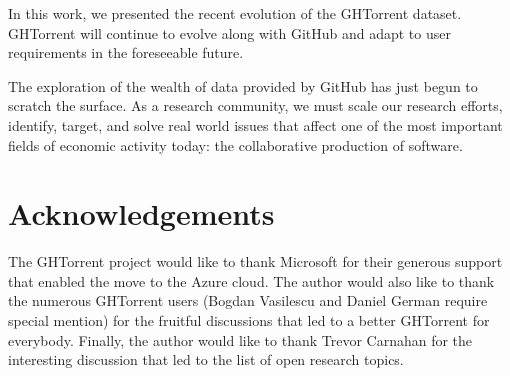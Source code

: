 \documentclass{sig-alternate}
\begin{document}
In this work, we presented the recent evolution of the GHTorrent dataset.
GHTorrent will continue to evolve along with GitHub and adapt to user
requirements in the foreseeable future.

The exploration of the wealth of data provided by GitHub has just begun to
scratch the surface. As a research community, we must scale our research
efforts, identify, target, and solve real world issues that affect one of the
most important fields of economic activity today: the collaborative production
of software.

\section*{Acknowledgements}

The GHTorrent project would like to thank Microsoft for their generous support
that enabled the move to the Azure cloud. The author would also like to thank
the numerous GHTorrent users (Bogdan Vasilescu and Daniel German require
special mention) for the fruitful discussions that led to a better GHTorrent
for everybody. Finally, the author would like to thank Trevor Carnahan for the
interesting discussion that led to the list of open research topics.



\end{document}
